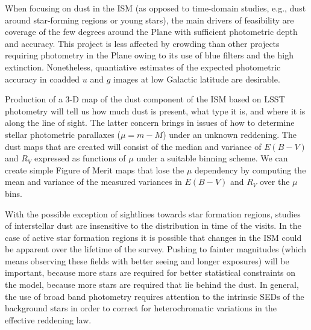 When focusing on dust in the ISM (as
opposed to time-domain studies, e.g., dust around star-forming
regions or young stars), the main drivers of feasibility are
coverage of the few degrees around the Plane with sufficient photometric depth
and accuracy. This project is less affected by crowding than other
projects requiring photometry in the Plane owing to its use of blue
filters and the high extinction.  Nonetheless, quantiative estimates of
the expected photometric accuracy in coadded $u$ and $g$ images at low
Galactic latitude are desirable.

Production of a 3-D map of the dust component of the ISM based on LSST
photometry will tell us how much dust is present, what type it is, and
where it is along the line of sight.  The latter concern brings in
issues of how to determine stellar photometric parallaxes ($\mu = m-M$)
under an unknown reddening. The dust maps that are created will consist
of the median and variance of $E(B-V)$ and $R_V$ expressed as functions
of $\mu$ under a suitable binning scheme. We can create simple Figure of
Merit maps that lose the $\mu$ dependency by computing the mean and
variance of the measured variances in $E(B-V)$ and $R_V$ over the $\mu$
bins.

With the possible exception of sightlines towards star formation
regions, studies of interstellar dust are insensitive to the
distribution in time of the visits. In the case of active star formation
regions it is possible that changes in the ISM could be apparent over
the lifetime of the survey. Pushing to fainter magnitudes (which means
observing these fields with better seeing and longer exposures) will be
important, because more stars are required for better statistical
constraints on the model, because more stars are required that lie
behind the dust. In general, the use of broad band photometry requires
attention to the intrinsic SEDs of the background stars in order to
correct for heterochromatic variations in the effective reddening law.

